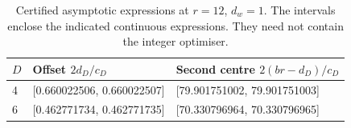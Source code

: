 \begin{table}[htbp]
\centering
\caption{Certified asymptotic expressions at $r=12$, $d_w=1$. The intervals enclose the indicated continuous expressions. They need not contain the integer optimiser.}
\label{tab:signed_second_centers}
\begin{tabular}{lll}
\toprule
$D$ & Offset $2d_D/c_D$ & Second centre $2(br-d_D)/c_D$ \\
\midrule
4 & [0.660022506, 0.660022507] & [79.901751002, 79.901751003] \\
6 & [0.462771734, 0.462771735] & [70.330796964, 70.330796965] \\
\bottomrule
\end{tabular}
\end{table}
